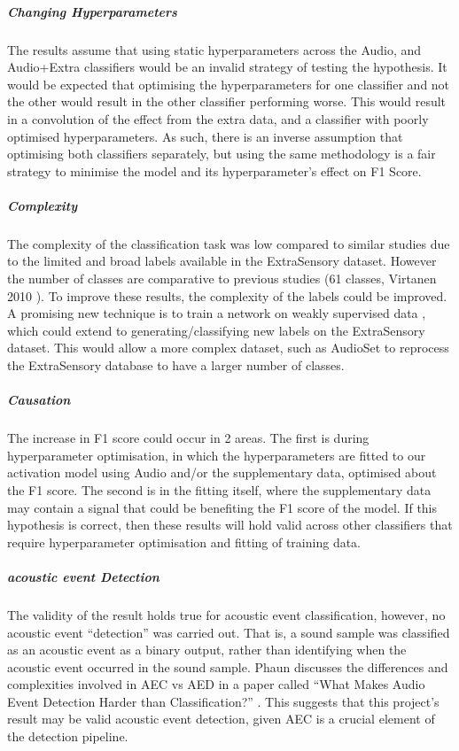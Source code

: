 \documentclass{UoNMCHA}
\newcommand{\inlineQuote}[1]{``#1''}
\numberwithin{equation}{section}
\begin{document}
\subparagraph{Changing Hyperparameters}
The results assume that using static hyperparameters across the Audio, and Audio+Extra classifiers would be an invalid strategy of testing the hypothesis. It would be expected that optimising the hyperparameters for one classifier and not the other would result in the other classifier performing worse. This would result in a convolution of the effect from the extra data, and a classifier with poorly optimised hyperparameters. As such, there is an inverse assumption that optimising both classifiers separately, but using the same methodology is a fair strategy to minimise the model and its hyperparameter's effect on F1 Score.

\subparagraph{Complexity} 
The complexity of the classification task was low compared to similar studies \cite{Tseng2017}\cite{Virtanen2010} due to the limited and broad labels available in the ExtraSensory dataset. However the number of classes are comparative to previous studies (61 classes, Virtanen 2010 \cite{Virtanen2010}). To improve these results, the complexity of the labels could be improved. A promising new technique is to train a network on weakly supervised data \cite{Tseng2017}, which could extend to generating/classifying new labels on the ExtraSensory dataset. This would allow a more complex dataset, such as AudioSet \cite{Audiosetgoogle2018} to reprocess the ExtraSensory database to have a larger number of classes.

\subparagraph{Causation}
The increase in F1 score could occur in 2 areas. The first is during hyperparameter optimisation, in which the hyperparameters are fitted to our activation model using Audio and/or the supplementary data, optimised about the F1 score. The second is in the fitting itself, where the supplementary data may contain a signal that could be benefiting the F1 score of the model. If this hypothesis is correct, then these results will hold valid across other classifiers that require hyperparameter optimisation and fitting of training data.

\subparagraph{acoustic event Detection}
The validity of the result holds true for acoustic event classification, however, no acoustic event \inlineQuote{detection} was carried out. That is, a sound sample was classified as an acoustic event as a binary output, rather than identifying when the acoustic event occurred in the sound sample. Phaun discusses the differences and complexities involved in AEC vs AED in a paper called \inlineQuote{What Makes Audio Event Detection Harder than Classification?} \cite{Phan2016}. This suggests that this project's result may be valid acoustic event detection, given AEC is a crucial element of the detection pipeline.
\end{document}
